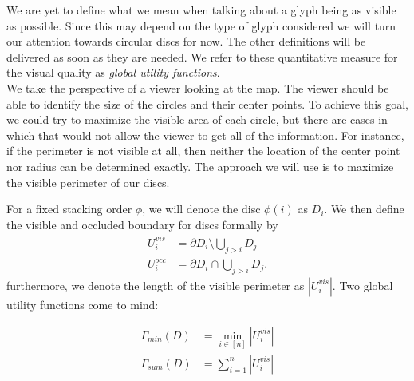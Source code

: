 \documentclass[a4paper,11pt]{article}
\begin{document}
We are yet to define what we mean when talking about a glyph being as visible as possible. Since this may depend on the type of glyph considered we will turn our attention towards circular discs for now. The other definitions will be delivered as soon as they are needed. We refer to these quantitative measure for the visual quality as \textit{global utility functions}.\\

We take the perspective of a viewer looking at the map. The viewer should be able to identify the size of the circles and their center points. To achieve this goal, we could try to maximize the visible area of each circle, but there are cases in which that would not allow the viewer to get all of the information. For instance, if the perimeter is not visible at all, then neither the location of the center point nor radius can be determined exactly. The approach we will use is to maximize the visible perimeter of our discs.\\

\newpage

For a fixed stacking order $\phi$, we will denote the disc $\phi(i)$ as $D_i$. We then define the visible and occluded boundary for discs formally by\\
%
\begin{align*}
  U_i^{vis} & =\partial D_i\setminus \bigcup_{j>i} D_{j} \\
  U_i^{occ} & =\partial D_i \cap \bigcup_{j>i} D_{j}.
\end{align*}
%
furthermore, we denote the length of the visible perimeter as $|U^{vis}_i|$. Two global utility functions come to mind:

\begin{align*}
    \Gamma_{min} (D) &= \min_{i \in [n]}|U_i^{vis}|\\
    \Gamma_{sum} (D) &= \sum_{i=1}^n|U_i^{vis}|
\end{align*}
\end{document}

